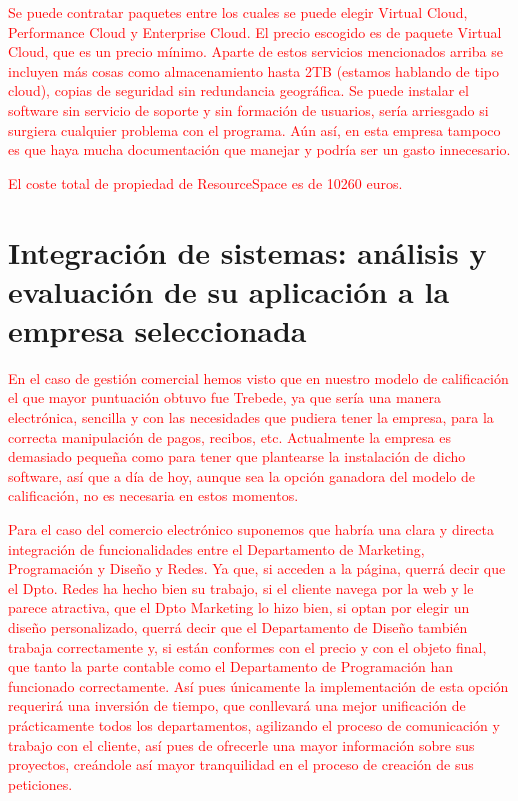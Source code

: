 \documentclass{article}
\begin{document}
\begin{itemize}
\begin{center}
\end{center}
\textcolor{Red}{Se puede contratar paquetes entre los cuales se puede elegir Virtual Cloud, Performance Cloud y Enterprise Cloud. El precio escogido es de paquete Virtual Cloud, que es un precio mínimo. Aparte de estos servicios mencionados arriba se incluyen más cosas como almacenamiento hasta 2TB (estamos hablando de tipo cloud), copias de seguridad sin redundancia geográfica. Se puede instalar el software sin servicio de soporte y sin formación de usuarios, sería arriesgado si surgiera cualquier problema con el programa. Aún así, en esta empresa tampoco es que haya mucha documentación que manejar y podría ser un gasto innecesario.}  

\textcolor{Red}{El coste total de propiedad de ResourceSpace es de 10260 euros.}
\end{itemize}

\section{Integración de sistemas: análisis y evaluación de su aplicación a la empresa seleccionada}

\textcolor{Red}{En el caso de gestión comercial hemos visto que en nuestro modelo de calificación el que mayor puntuación obtuvo fue Trebede, ya que sería una manera electrónica, sencilla y con las necesidades que pudiera tener la empresa, para la correcta manipulación de pagos, recibos, etc. Actualmente la empresa es demasiado pequeña como para tener que plantearse la instalación de dicho software, así que a día de hoy, aunque sea la opción ganadora del modelo de calificación, no es necesaria en estos momentos.}

\textcolor{Red}{Para el caso del comercio electrónico suponemos que habría una clara y directa integración de funcionalidades entre el Departamento de Marketing, Programación y Diseño y Redes. Ya que, si acceden a la página, querrá decir que el Dpto. Redes ha hecho bien su trabajo, si el cliente navega por la web y le parece atractiva, que el Dpto Marketing lo hizo bien, si optan por elegir un diseño personalizado, querrá decir que el Departamento de Diseño también trabaja correctamente y, si están conformes con el precio y con el objeto final, que tanto la parte contable como el Departamento de Programación han funcionado correctamente. Así pues únicamente la implementación de esta opción requerirá una inversión de tiempo, que conllevará una mejor unificación de prácticamente todos los departamentos, agilizando el proceso de comunicación y trabajo con el cliente, así pues de ofrecerle una mayor información sobre sus proyectos, creándole así mayor tranquilidad en el proceso de creación de sus peticiones.}
\end{document}
